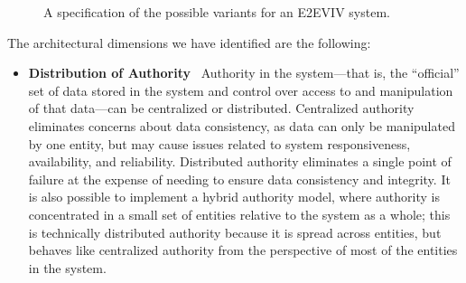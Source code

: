 \begin{figure}
\begin{center}

\end{center}
\caption{A specification of the possible variants for an E2EVIV system.}
\label{figure:arch-choices}
\end{figure}

The architectural dimensions we have identified are the following:

\begin{itemize}
\item \textbf{Distribution of Authority} \ Authority in the
  system---that is, the ``official'' set of data stored in the system
  and control over access to and manipulation of that data---can be
  centralized or distributed. Centralized authority eliminates
  concerns about data consistency, as data can only be manipulated by
  one entity, but may cause issues related to system responsiveness,
  availability, and reliability. Distributed authority eliminates a
  single point of failure at the expense of needing to ensure data
  consistency and integrity. It is also possible to implement a hybrid
  authority model, where authority is concentrated in a small set of
  entities relative to the system as a whole; this is technically
  distributed authority because it is spread across entities, but
  behaves like centralized authority from the perspective of most of
  the entities in the system.


\end{itemize}
